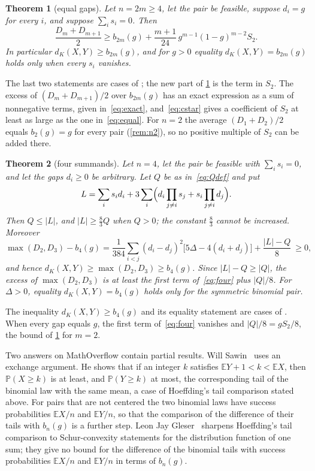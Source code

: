 \documentclass[11pt,a4paper]{article}
\numberwithin{equation}{section}
\newtheorem{theorem}{Theorem}[section]
\theoremstyle{remark}
\newcommand{\Pp}{\mathbb P}
\newcommand{\E}{\mathbb E}
\begin{document}
\begin{theorem}[equal gaps]\label{thm:equal}
Let $n=2m\ge4$, let the pair be feasible, suppose $d_i=g$ for every $i$, and suppose $\sum_i s_i=0$. Then
\begin{equation}\label{eq:equal}
\frac{D_m+D_{m+1}}2\ge b_{2m}(g)+\frac{m+1}{24}\,g^{m-1}(1-g)^{m-2}S_2 .
\end{equation}
In particular $d_K(X,Y)\ge b_{2m}(g)$, and for $g>0$ equality $d_K(X,Y)=b_{2m}(g)$ holds only when every $s_i$ vanishes.
\end{theorem}

The last two statements are cases of \cite[Theorem~1.1]{Long}; the new part of \cref{thm:equal} is the term in $S_2$. The excess of $(D_m+D_{m+1})/2$ over $b_{2m}(g)$ has an exact expression as a sum of nonnegative terms, given in~\eqref{eq:exact}, and~\eqref{eq:cstar} gives a coefficient of $S_2$ at least as large as the one in~\eqref{eq:equal}. For $n=2$ the average $(D_1+D_2)/2$ equals $b_2(g)=g$ for every pair (\cref{rem:n2}), so no positive multiple of $S_2$ can be added there.

\begin{theorem}[four summands]\label{thm:four}
Let $n=4$, let the pair be feasible with $\sum_i s_i=0$, and let the gaps $d_i\ge0$ be arbitrary. Let $Q$ be as in~\eqref{eq:Qdef} and put
\[
L=\sum_i s_id_i+3\sum_i\Bigl(d_i\prod_{j\ne i}s_j+s_i\prod_{j\ne i}d_j\Bigr).
\]
Then $Q\le|L|$, and $|L|\ge\frac83Q$ when $Q>0$; the constant $\frac83$ cannot be increased. Moreover
\begin{equation}\label{eq:four}
\max(D_2,D_3)-b_4(g)=\frac1{384}\sum_{i<j}(d_i-d_j)^2\bigl[5\Delta-4(d_i+d_j)\bigr]+\frac{|L|-Q}8\ \ge0 ,
\end{equation}
and hence $d_K(X,Y)\ge\max(D_2,D_3)\ge b_4(g)$. Since $|L|-Q\ge|Q|$, the excess of $\max(D_2,D_3)$ is at least the first term of~\eqref{eq:four} plus $|Q|/8$.
For $\Delta>0$, equality $d_K(X,Y)=b_4(g)$ holds only for the symmetric binomial pair.
\end{theorem}

The inequality $d_K(X,Y)\ge b_4(g)$ and its equality statement are cases of \cite[Theorem~1.1]{Long}. When every gap equals $g$, the first term of~\eqref{eq:four} vanishes and $|Q|/8=gS_2/8$, the bound of \cref{thm:equal} for $m=2$.

Two answers on MathOverflow contain partial results. Will Sawin~\cite{Sawin} uses an exchange argument. He shows that if an integer $k$ satisfies $\E Y+1<k<\E X$, then $\Pp(X\ge k)$ is at least, and $\Pp(Y\ge k)$ at most, the corresponding tail of the binomial law with the same mean, a case of Hoeffding's tail comparison stated above. For pairs that are not centered the two binomial laws have success probabilities $\E X/n$ and $\E Y/n$, so that the comparison of the difference of their tails with $b_n(g)$ is a further step. Leon Jay Gleser~\cite{Gleser} sharpens Hoeffding's tail comparison to Schur-convexity statements for the distribution function of one sum; they give no bound for the difference of the binomial tails with success probabilities $\E X/n$ and $\E Y/n$ in terms of $b_n(g)$.
\end{document}
